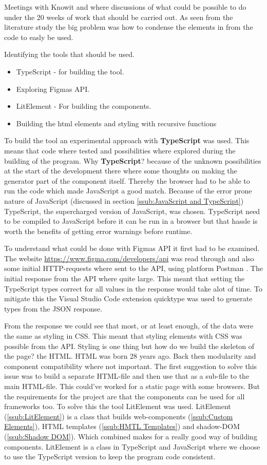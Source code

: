 Meetings with Knowit and where discussions of what could be possible to do under the 20 weeks of work that should be carried out. As seen from the literature study the big problem was how to condense the elements in from the code to easly be used. 

Identifying the tools that should be used.
\begin{itemize}
  \item TypeScript - for building the tool.
  \item Exploring Figmas API.
  \item LitElement - For building the components. 
  \item Building the html elements and styling with recursive functions
\end{itemize}

To build the tool an experimental approach with \textbf{TypeScript} was used. This means that code where tested and possibilities where explored during the building of the program. Why \textbf{TypeScript}? because of the unknown possibilities at the start of the development there where some thoughts on making the generator part of the component itself. Thereby the browser had to be able to run the code which made JavaScript a good match. Because of the error prone nature of JavaScript (discussed in section \ref{ssub:JavaScript and TypeScript}) TypeScript, the supercharged version of JavaScript, was chosen. TypeScript need to be compiled to JavaScript before it can be run in a browser but that hassle is worth the benefits of getting error warnings before runtime.

To understand what could be done with Figmas API it first had to be examined. The website \url{https://www.figma.com/developers/api} was read through and also some initial HTTP-requests where sent to the API, using platform Postman \cite{PostmanCollaborationPlatform}. The initial response from the API where quite large. This meant that setting the TypeScript types correct for all values in the response would take alot of time. To mitigate this the Visual Studio Code \cite{VisualStudioCode} extension quicktype\cite{ConvertJSONSwift} was used to generate types from the JSON response. 

From the response we could see that most, or at least enough, of the data were the same as styling in CSS. This meant that styling elements with CSS was possible from the API. Styling is one thing but how do we build the skeleton of the page? the HTML. HTML was born 28 years ago. Back then modularity and component compatibility where not important. The first suggestion to solve this issue was to build a separate HTML-file and then use that as a sub-file to the main HTML-file. This could've worked for a static page with some browsers. But the requirements for the project are that the components can be used for all frameworks too. To solve this the tool LitElement was used. LitElement (\ref{ssub:LitElement}) is a class that builds web-components (\ref{ssub:Custom Elements}), HTML templates (\ref{ssub:HMTL Templates}) and shadow-DOM (\ref{ssub:Shadow DOM}). Which combined makes for a really good way of building components. LitElement is a class in TypeScript and JavaScript where we choose to use the TypeScript version to keep the program code consistent. 

